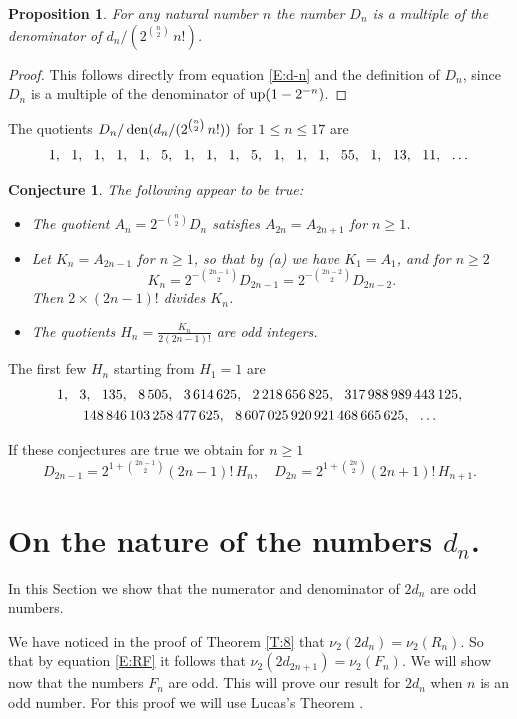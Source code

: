 \documentclass[10pt]{amsart}
\newtheorem{prop}[thm]{Proposition}
\newtheorem{conj}[thm]{Conjecture}
\theoremstyle{definition}
\theoremstyle{remark}
\def\nn{\mskip12mu}
\begin{document}
\begin{prop}
For any natural number $n$ the number $D_n$ is a multiple of the denominator of
$d_n/(2^{\binom{n}{2}}\,n!)$.
\end{prop}
\begin{proof}
This follows directly from equation \eqref{E:d-n} and the definition of
$D_n$, since $D_n$ is a multiple of the denominator of $\operatorname{up}(1-2^{-n})$.
\end{proof}

The quotients $D_n/\operatorname{den}(d_n/(2^{\binom{n}{2}}\,n!))$ for $1\le n\le 17$ are
\[1,\nn 1,\nn 1,\nn 1,\nn 1,\nn 5,\nn 1,\nn 1,\nn 1,\nn 5,\nn 1,\nn 1,\nn 1,\nn 55,\nn1,\nn13,\nn11,\nn\dots\]

\begin{conj}\label{C:nueva}
The following appear to be true:
\begin{itemize}
\item[(a)]
The quotient $A_n=2^{-\binom{n}{2}}D_n$ satisfies $A_{2n}=A_{2n+1}$ for $n\ge1$.
\item[(b)] Let $K_{n}=A_{2n-1}$ for $n\ge1$, so that
by (a) we have $K_1=A_1$, and for $n\ge2$
\[K_n=2^{-\binom{2n-1}{2}}D_{2n-1}=2^{-\binom{2n-2}{2}}D_{2n-2}.\]
Then $2\times(2n-1)!$ divides $K_n$.
\item[(c)] The quotients $H_n=\frac{K_n}{2(2n-1)!}$ are odd integers.
\end{itemize}
\end{conj}

The first few $H_n$ starting from $H_1=1$ are
\begin{gather*}
1,\nn 3,\nn 135,\nn 8\,505,\nn 3\,614\,625,\nn 2\,218\,656\,825,\nn 317\,988\,989\,443\,125,\\
148\,846\,103\,258\,477\,625,\nn 8\,607\,025\,920\,921\,468\,665\,625,\nn \dots
\end{gather*}

If these conjectures are true we obtain for $n\ge1$
\[D_{2n-1}=2^{1+\binom{2n-1}{2}}(2n-1)!\, H_n,\quad D_{2n}=
2^{1+\binom{2n}{2}}(2n+1)!\, H_{n+1}.\]

\section{On the nature of the numbers $d_n$.}

In this Section we show that the numerator and denominator of $2d_n$ are odd numbers.


We have noticed in the proof
of Theorem \ref{T:8} that $\nu_2(2d_n)=\nu_2(R_n)$. So that by equation
\eqref{E:RF} it follows that $\nu_2(2d_{2n+1})=\nu_2(F_n)$. We will show
now that the numbers $F_n$ are odd.
This will prove our result for $2d_n$ when $n$ is an odd number.
For this proof we will use Lucas's Theorem \cite{MR0023257}.
\end{document}
